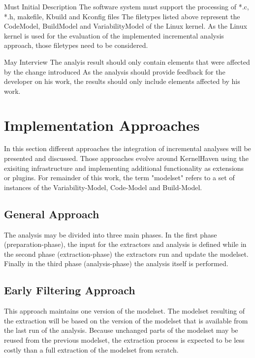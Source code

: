 \documentclass[a4paper]{article}
\begin{document}
\clearpage
\begin{req} 
\reqtable
    {Must}  {Initial Description}
	{The software system must support the processing of *.c, *.h, makefile, Kbuild and Kconfig files}
	{The filetypes listed above represent the CodeModel, BuildModel and VariabilityModel of the Linux kernel. As the Linux kernel is used for the evaluation of the implemented incremental analysis approach, those filetypes need to be considered.}
\end{req}

\begin{req} 
\reqtable
    {May}  {Interview}
	{The analyis result should only contain elements that were affected by the change introduced}
	{As the analysis should provide feedback for the developer on his work, the results should only include elements affected by his work.}
\end{req}

\newpage

\section{Implementation Approaches}

In this section different approaches the integration of incremental analyses will be presented and discussed. Those approaches evolve around KernelHaven using the exisiting infrastructure and implementing additional functionality as extensions or plugins. For remainder of this work, the term "modelset" refers to a set of instances of the Variability-Model, Code-Model and Build-Model.

\subsection{General Approach}

The analysis may be divided into three main phases. In the first phase (preparation-phase), the input for the extractors and analysis is defined while in the second phase (extraction-phase) the extractors run and update the modelset. Finally in the third phase (analysis-phase) the analysis itself is performed.


\subsection{Early Filtering Approach} \label{early}

This approach maintains one version of the modelset. The modelset resulting of the extraction will be based on the version of the modelset that is available from the last run of the analysis. Because unchanged parts of the modelset may be reused from the previous modelset, the extraction process is expected to be less costly than a full extraction of the modelset from scratch.
\end{document}
